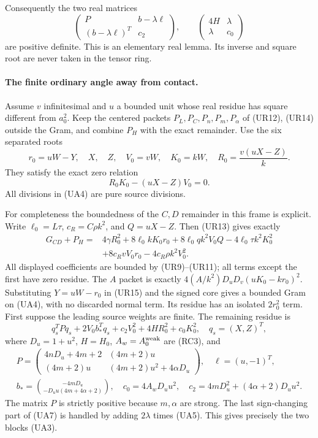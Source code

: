 Consequently the two real matrices
\[
 \begin{pmatrix}P&b-\lambda\ell\\(b-\lambda\ell)^T&c_2\end{pmatrix},
 \qquad
 \begin{pmatrix}4H&\lambda\\\lambda&c_0\end{pmatrix}       \tag{UA3}
\]
are positive definite. This is an elementary real lemma. Its inverse
and square root are never taken in the tensor ring.

\paragraph{The finite ordinary angle away from contact.}
Assume $v$ infinitesimal and $u$ a bounded unit whose real residue has
square different from $a_0^2$. Keep the centered packets
$P_L,P_C,P_n,P_m,P_\alpha$ of (UR12), (UR14) outside the Gram, and
combine $P_H$ with the exact remainder. Use the six separated roots
\[
 r_0=uW-Y,\quad X,\quad Z,\quad V_0=vW,\quad K_0=kW,
 \quad R_0=\frac{v(uX-Z)}{k}.                           \tag{UA4}
\]
They satisfy the exact zero relation
\[
 R_0K_0-(uX-Z)V_0=0.                                  \tag{UA5}
\]
All divisions in (UA4) are pure source divisions.

For completeness the boundedness of the $C,D$ remainder in this frame
is explicit. Write $\ell_0=L\tau$, $c_R=C\rho k^2$, and
$Q=uX-Z$. Then (UR13) gives exactly
\begin{align*}
 G_{CD}+P_H={}&4\gamma R_0^2
 +8\ell_0kK_0r_0+8\ell_0qk^2V_0Q-4\ell_0\tau k^2K_0^2\\
 &+8c_RvV_0r_0-4c_R\rho k^2V_0^2.                  \tag{UA6}
\end{align*}
All displayed coefficients are bounded by (UR9)--(UR11); all terms
except the first have zero residue. The $A$ packet is exactly
$4(A/k^2)D_uD_v(uK_0-kr_0)^2$. Substituting
$Y=uW-r_0$ in (UR15) and the signed core gives a bounded Gram on
(UA4), with no discarded normal term. Its residue has an isolated
$2r_0^2$ term. First suppose the leading source weights are finite.
The remaining residue is
\[
 q_s^TPq_s+2V_0b_*^Tq_s+c_2V_0^2+4H R_0^2+c_0K_0^2,
 \quad q_s=(X,Z)^T,                                  \tag{UA7}
\]
where $D_u=1+u^2$, $H=H_0$, $A_w=A_0^{\rm weak}$ are (RC3), and
\[
\begin{gathered}
 P=\begin{pmatrix}
 4nD_u+4m+2&(4m+2)u\\
 (4m+2)u&(4m+2)u^2+4\alpha D_u
 \end{pmatrix},\quad \ell=(u,-1)^T,\\
 b_*=\binom{-4mD_u}{-D_uu(4m+4\alpha+2)},\quad
 c_0=4A_wD_uu^2,\quad
 c_2=4mD_u^2+(4\alpha+2)D_uu^2.                      \tag{UA8}
\end{gathered}
\]
The matrix $P$ is strictly positive because $m,\alpha$ are strong.
The last sign-changing part of (UA7) is handled by adding
$2\lambda$ times (UA5). This gives precisely the two blocks (UA3).

